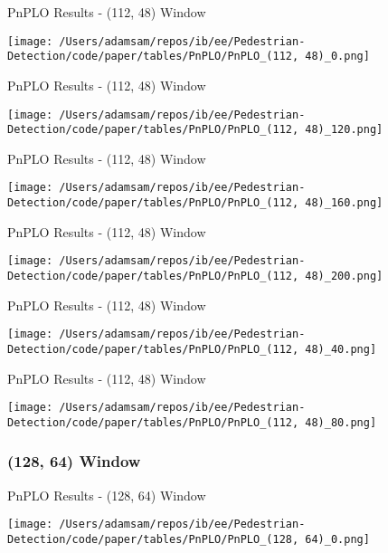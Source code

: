 \begin{table}
    \caption{PnPLO Results - (112, 48) Window}
    \texttt{[image: /Users/adamsam/repos/ib/ee/Pedestrian-Detection/code/paper/tables/PnPLO/PnPLO\_(112, 48)\_0.png]}
    \label{tab:PnPLO_(112, 48)_0}
\end{table}

\begin{table}
    \caption{PnPLO Results - (112, 48) Window}
    \texttt{[image: /Users/adamsam/repos/ib/ee/Pedestrian-Detection/code/paper/tables/PnPLO/PnPLO\_(112, 48)\_120.png]}
    \label{tab:PnPLO_(112, 48)_120}
\end{table}

\begin{table}
    \caption{PnPLO Results - (112, 48) Window}
    \texttt{[image: /Users/adamsam/repos/ib/ee/Pedestrian-Detection/code/paper/tables/PnPLO/PnPLO\_(112, 48)\_160.png]}
    \label{tab:PnPLO_(112, 48)_160}
\end{table}

\begin{table}
    \caption{PnPLO Results - (112, 48) Window}
    \texttt{[image: /Users/adamsam/repos/ib/ee/Pedestrian-Detection/code/paper/tables/PnPLO/PnPLO\_(112, 48)\_200.png]}
    \label{tab:PnPLO_(112, 48)_200}
\end{table}

\begin{table}
    \caption{PnPLO Results - (112, 48) Window}
    \texttt{[image: /Users/adamsam/repos/ib/ee/Pedestrian-Detection/code/paper/tables/PnPLO/PnPLO\_(112, 48)\_40.png]}
    \label{tab:PnPLO_(112, 48)_40}
\end{table}

\begin{table}
    \caption{PnPLO Results - (112, 48) Window}
    \texttt{[image: /Users/adamsam/repos/ib/ee/Pedestrian-Detection/code/paper/tables/PnPLO/PnPLO\_(112, 48)\_80.png]}
    \label{tab:PnPLO_(112, 48)_80}
\end{table}

\subsubsection*{(128, 64) Window}

\begin{table}
    \caption{PnPLO Results - (128, 64) Window}
    \texttt{[image: /Users/adamsam/repos/ib/ee/Pedestrian-Detection/code/paper/tables/PnPLO/PnPLO\_(128, 64)\_0.png]}
    \label{tab:PnPLO_(128, 64)_0}
\end{table}

